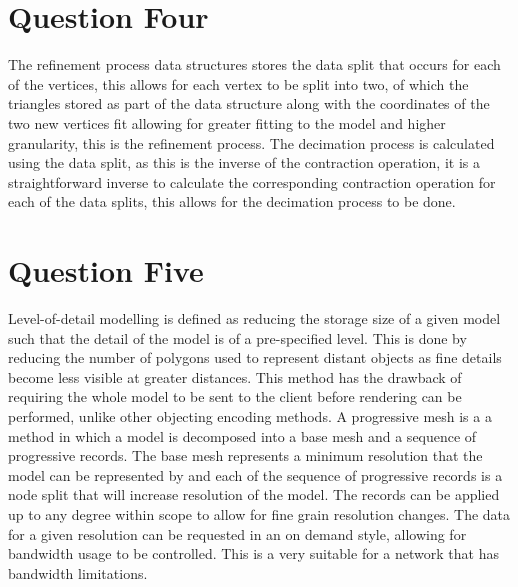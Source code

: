 \documentclass[paper=a4, fontsize=11pt]{scrartcl}
\numberwithin{equation}{section}		%
\numberwithin{figure}{section}			%
\numberwithin{table}{section}				%
\begin{document}
\section*{Question Four}

\iffalse
10 marks \\
100 words \\
Explain how progressive meshes implement the refinement and decimation processes. \\
\fi

The refinement process data structures stores the data split that occurs for each of the vertices, this allows for each vertex to be split into two, of which the triangles stored as part of the data structure along with the coordinates of the two new vertices fit allowing for greater fitting to the model and higher granularity, this is the refinement process. The decimation process is calculated using the data split, as this is the inverse of the contraction operation, it is a straightforward inverse to calculate the corresponding contraction operation for each of the data splits, this allows for the decimation process to be done.

\section*{Question Five}

\iffalse
20 marks \\
200 words \\
Analyse how the incorporation of level-of-detail modeling impacts the rendering performance
and network bandwidth consumption of a large distributed virtual environment system.
Evaluate the suitability of using progressive meshes to implement the level-of-detail modeling
in such a system. \\
Note that in the above distributed virtual environment system, all graphics models of the virtual
environment are maintained by a remote server. During runtime, each client will download
relevant graphics models on-demand from the server to support interaction and visualisation. \\
\fi

Level-of-detail modelling is defined as reducing the storage size of a given model such that the detail of the model is of a pre-specified level. This is done by reducing the number of polygons used to represent distant objects as fine details become less visible at greater distances. This method has the drawback of requiring the whole model to be sent to the client before rendering can be performed, unlike other objecting encoding methods. A progressive mesh is a a method in which a model is decomposed into a base mesh and a sequence of progressive records. The base mesh represents a minimum resolution that the model can be represented by and each of the sequence of progressive records is a node split that will increase resolution of the model. The records can be applied up to any degree within scope to allow for fine grain resolution changes. The data for a given resolution can be requested in an on demand style, allowing for bandwidth usage to be controlled. This is a very suitable for a network that has bandwidth limitations.
\end{document}
